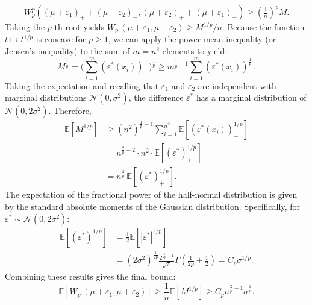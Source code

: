 \documentclass{article}
\theoremstyle{plain}
\theoremstyle{definition}
\theoremstyle{remark}
\newcommand{\E}{\mathbb{E}}
\begin{document}
\begin{equation}
    W_p^p((\mu+\varepsilon_1)_+ + (\mu+\varepsilon_2)_-, (\mu+\varepsilon_2)_+ + (\mu+\varepsilon_1)_-) \ge \left(\tfrac{1}{n}\right)^p M.
\end{equation}
Taking the $p$-th root yields $W_p^\pm(\mu+\varepsilon_1, \mu+\varepsilon_2) \ge M^{1/p} / n$.
Because the function $t \mapsto t^{1/p}$ is concave for $p \ge 1$, we can apply the power mean inequality (or Jensen's inequality) to the sum of $m = n^2$ elements to yield:
\begin{equation}
    M^{\tfrac{1}{p}} 
    = \bigg( \sum_{i=1}^{m} (\varepsilon^*(x_i))_+ \bigg)^{\tfrac{1}{p}} 
    \ge m^{\frac{1}{p}-1} \sum_{i=1}^{m} (\varepsilon^*(x_i))_+^{\tfrac{1}{p}}.
\end{equation}
Taking the expectation and recalling that $\varepsilon_1$ and $\varepsilon_2$ are independent with marginal distributions $\mathcal{N}(0, \sigma^2)$, the difference $\varepsilon^*$ has a marginal distribution of $\mathcal{N}(0, 2\sigma^2)$. Therefore,
\begin{align}
    \E\left[ M^{1/p} \right] 
    &\ge (n^2)^{\frac{1}{p}-1} \sum_{i=1}^{n^2} \E\left[ (\varepsilon^*(x_i))_+^{1/p} \right] \\
    &= n^{\frac{2}{p}-2} \cdot n^2 \cdot \E\left[ (\varepsilon^*)_+^{1/p} \right]\\
    &= n^{\frac{2}{p}} \, \E\left[ (\varepsilon^*)_+^{1/p} \right].
\end{align}
The expectation of the fractional power of the half-normal distribution is given by the standard absolute moments of the Gaussian distribution. Specifically, for $\varepsilon^* \sim \mathcal{N}(0, 2\sigma^2)$:
\begin{align}
    \E\left[ (\varepsilon^*)_+^{1/p} \right] 
    &= \frac{1}{2} \E\left[ |\varepsilon^*|^{1/p} \right] \\
    &= (2\sigma^2)^{\frac{1}{2p}} \frac{2^{\frac{1}{2p}-1}}{\sqrt{\pi}} \Gamma\left(\frac{1}{2p} + \frac{1}{2}\right) 
    = C_p \sigma^{1/p}. \nonumber   
\end{align}
Combining these results gives the final bound:
\begin{equation}
    \E \left[ W_p^\pm(\mu+\varepsilon_1, \mu+\varepsilon_2) \right] \ge \frac{1}{n} \E\left[ M^{1/p} \right] \ge C_p n^{\frac{2}{p}-1} \sigma^{\frac{1}{p}}.
\end{equation}
\end{document}
